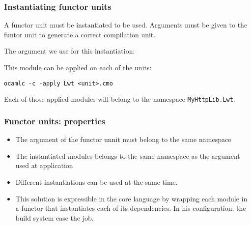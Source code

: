 \documentclass{beamer}
\begin{document}
\begin{frame}[fragile]
\frametitle{Instantiating functor units}

 {
  A functor unit must be instantiated to be used. Arguments must be given to the
  funtor unit to generate a correct compilation unit.
}


 {
  The argument we use for this instantiation:
  \medskip
  \lwtbinding
}

 {
  This module can be applied on each of the units:
  
  \begin{block}{}
    \texttt{ocamlc -c -apply Lwt <unit>.cmo}
  \end{block}

  \medskip

  Each of those applied modules will belong to the namespace
  \texttt{MyHttpLib.Lwt}. 
}

\end{frame}


\begin{frame}
\frametitle{Functor units: properties}

\begin{itemize}
\item<1-> The argument of the functor unnit must belong to the same namespace
\item<2-> The instantiated modules belongs to the same namespace as the argument
  used at application
\item<3-> Different instantiations can be used at the same time.
\item<4-> This solution is expressible in the core language by wrapping each
  module in a functor that instantiates each of its dependencies. In his
  configuration, the build system ease the job.
\end{itemize}

\end{frame}
\end{document}
